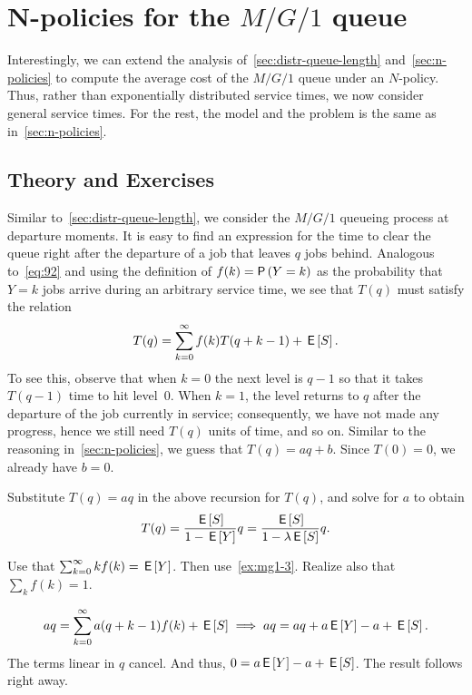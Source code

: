 \documentclass[companion]{subfiles}
\begin{document}
\section{N-policies for the $M/G/1$ queue}
\label{sec:n-policies-mg1}

Interestingly, we can extend the analysis of~\cref{sec:distr-queue-length} and~\cref{sec:n-policies} to compute the average cost of the $M/G/1$ queue under an $N$-policy.
Thus, rather than exponentially distributed service times, we now consider general service times.
For the rest, the model and the problem is the same as in~\cref{sec:n-policies}. 

{\subsection*{Theory and Exercises}
}


Similar to~\cref{sec:distr-queue-length}, we consider the $M/G/1$ queueing process at departure moments.
It is easy to find an expression for the time to clear the queue right after the departure of a job that leaves $q$ jobs behind.
Analogous to~\cref{eq:92} and using the definition of $f(k)=\P{Y=k}$ as the probability that $Y=k$ jobs arrive during an arbitrary service time, we see that $T(q)$ must satisfy the relation
\begin{equation*}
  T(q) = \sum_{k=0}^\infty f(k) T(q+k-1) + \,\mathsf{E}\left[S\right].
\end{equation*}
To see this, observe that when $k=0$ the next level is $q-1$ so that it takes $T(q-1)$ time to hit level~$0$.
When $k=1$, the level returns to $q$ after the departure of the job currently in service; consequently, we have not made any progress, hence we still need $T(q)$ units of time,  and so on.
Similar to the reasoning in~\cref{sec:n-policies}, we guess that $T(q) = a q + b$. Since $T(0)=0$, we already have $b=0$. 

\begin{exercise}
Substitute $T(q) = a q$ in the above recursion for $T(q)$, and solve for $a$ to obtain
\begin{equation*}
  T(q) = \frac{\,\mathsf{E}\left[S\right]}{1- \,\mathsf{E}\left[Y\right]}q = \frac{\,\mathsf{E}\left[S\right]}{1-\lambda \,\mathsf{E}\left[S\right]}q.
\end{equation*}
\begin{hint}
  Use that $\sum_{k=0}^\infty k f(k) = \,\mathsf{E}\left[Y\right]$. Then use~\cref{ex:mg1-3}. Realize also that $\sum_k f(k) = 1$. 
\end{hint}
\begin{solution}
  \begin{align*}
    a q = \sum_{k=0}^\infty a (q+k-1) f(k) + \,\mathsf{E}\left[S\right] \implies a q = a q + a \,\mathsf{E}\left[Y\right] - a + \,\mathsf{E}\left[S\right].
  \end{align*}
The terms linear in $q$ cancel. And thus, $0=a\,\mathsf{E}\left[Y\right] - a + \,\mathsf{E}\left[S\right]$. The result follows right away.
\end{solution}
\end{exercise}
\end{document}

